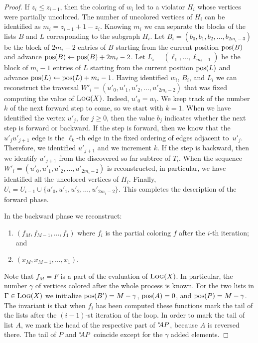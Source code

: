 \documentclass[11pt]{article}
\begin{document}
\begin{proof}
  If $z_i \leq z_{i-1}$, then the coloring of $w_i$ led to a violator $H_i$
  whose vertices were partially uncolored. The number of uncolored vertices of $H_i$ 
  can be identified as $m_i=z_{i-1} +1 - z_i$. 
  Knowing $m_i$ we can separate the blocks 
  of the lists $B$ and $L$ corresponding to the subgraph $H_i$.
  Let $B_i=(b_0,b_1,b_2,\ldots,b_{2m_i-3})$ be the block of $2m_i-2$
  entries of $B$ starting from the current position $\text{\rmfamily pos}(B)$ and advance
  $\text{\rmfamily pos}(B) \gets \text{\rmfamily pos}(B)+2m_i-2$. 
  Let $L_i=(\ell_1,\ldots,\ell_{m_i-1})$ be the block of $m_i-1$ entries
  of $L$ starting from the current position $\text{\rmfamily pos}(L)$ and advance
  $\text{\rmfamily pos}(L) \gets \text{\rmfamily pos}(L)+m_i-1$. 
  Having identified $w_i$, $B_i$, and $L_i$ we can reconstruct 
  the traversal $W'_i=(u'_0,u'_1,u'_2,\ldots,u'_{2m_i-2})$ that was fixed 
  computing the value of $\text{\scshape Log}(X)$.
  Indeed, $u'_0=w_i$. We keep track of the number $k$ of the next forward step to come, so we start with $k=1$.
  When we have identified the vertex $u'_j$, for $j\geq0$, then the value
  $b_j$ indicates whether the next step is forward or backward. 
  If the step is forward, then we know that the $u'_ju'_{j+1}$ edge is 
  the $\ell_{k}$-th edge in the fixed ordering of edges adjacent to~$u'_j$.
  Therefore, we identified $u'_{j+1}$ and we increment $k$.
  If the step is backward, then we identify $u'_{j+1}$ 
  from the discovered so far subtree of $T_i$.
  When the sequence $W'_i=(u'_0,u'_1,u'_2,\ldots,u'_{2m_i-2})$ is reconstructed, 
  in particular, we have identified all the uncolored vertices of $H_i$.
  Finally, $U_i = U_{i-1} \cup \{u'_0,u'_1,u'_2,\ldots,u'_{2m_i-2}\}$.
  This completes the description of the forward phase.  
  
  In the backward phase we reconstruct:
  \begin{enumerate}[label=\textup{(\roman*)},nosep]
    \item $(f_M,f_{M-1},\ldots,f_1)$ where $f_i$ is the partial coloring $f$ 
    after the $i$-th iteration; and 
    \item $(x_M,x_{M-1},\ldots,x_1)$.
  \end{enumerate}
  Note that $f_M=F$ is a part of the evaluation of $\text{\scshape Log}(X)$.
  In particular, the number $\gamma$ of vertices colored after the whole process is known.
  For the two lists in $\Gamma \in \text{\scshape Log}(X)$
  we initialize $\text{\rmfamily pos}(B') = M-\gamma$, $\text{\rmfamily pos}(A)=0$, and
  $\text{\rmfamily pos}(P)=M  - \gamma$.
  The invariant is that
  when $f_i$ has been computed these functions mark the
  tail of the lists after the $(i-1)$-st iteration of the
  loop. In order to mark the tail of list $A$, we mark the head of the respective part of ${}^{*}\kern-3pt AP$, because $A$ is reversed there. The tail of $P$ and ${}^{*}\kern-3pt AP$ coincide except for the $\gamma$ added elements.


\end{proof}
\end{document}

